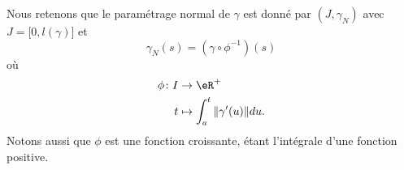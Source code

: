 Nous retenons que le paramétrage normal de \( \gamma\) est donné par \( (J,\gamma_N)\) avec \( J=\mathopen[ 0 , l(\gamma) \mathclose]\) et
\begin{equation}        \label{EqFomVPcogammaN}
	\gamma_N(s)=(\gamma\circ\phi^{-1})(s)
\end{equation}
où
\begin{equation}        \label{EqFomVPcoordnorm}
	\begin{aligned}
		\phi\colon I & \to \eR^+                           \\
		t            & \mapsto \int_a^t\| \gamma'(u) \|du.
	\end{aligned}
\end{equation}
Notons aussi que \( \phi\) est une fonction croissante, étant l'intégrale d'une fonction positive.

